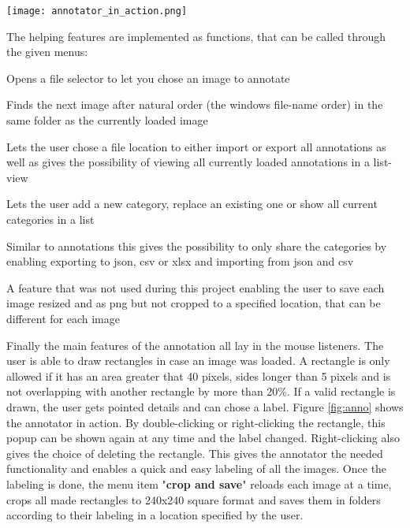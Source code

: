 \begin{figure*}[t]
    \centering
    \texttt{[image: annotator\_in\_action.png]}
    \caption{image annotator in action}
    \label{fig:anno}
\end{figure*}

The helping features are implemented as functions, that can be called through
the given menus:

\begin{description}[font=\sffamily\bfseries, leftmargin=1cm, style=nextline]
    \item[open image]
        Opens a file selector to let you chose an image to annotate
    \item[load next image]
        Finds the next image after natural order (the windows file-name order) in
        the same folder as the currently loaded image
    \item[save/import/view annotations]
        Lets the user chose a file location to either import or export all
        annotations as well as gives the possibility of viewing all currently
        loaded annotations in a list-view
    \item[add/replace/show category]
         Lets the user add a new category, replace an existing one or show all
         current categories in a list
    \item[import/export categories]
        Similar to annotations this gives the possibility to only share the
        categories by enabling exporting to json, csv or xlsx and importing from
        json and csv
    \item[replace/change destination]
        A feature that was not used during this project enabling the user to
        save each image resized and as png but not cropped to a specified
        location, that can be different for each image
\end{description}

Finally the main features of the annotation all lay in the mouse listeners. 
The user is able to draw rectangles in case an image was loaded.
A rectangle is only allowed if it has an area greater that 40 pixels, sides
longer than 5 pixels and is not overlapping with another rectangle by more than
20\%. If a valid rectangle is drawn, the user gets pointed details and can
chose a label. Figure \ref{fig:anno} shows the annotator in action. By
double-clicking or right-clicking the rectangle, this popup can be shown again
at any time and the label changed. Right-clicking also gives the choice of
deleting the rectangle.
\newline
This gives the annotator the needed functionality and enables a quick and
easy labeling of all the images. Once the labeling is done, the menu item
"\textbf{crop and save}" reloads each image at a time, crops all made rectangles
to 240x240 square format and saves them in folders according to their labeling
in a location specified by the user.

